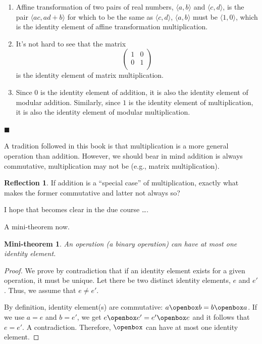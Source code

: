 \documentclass[english,notitlepage,smartquotes]{hgbreport}
\theoremstyle{definition}
\theoremstyle{definition}
\theoremstyle{remark}
\theoremstyle{definition}
\theoremstyle{plain}
\newtheorem{mini-theorem}{Mini-theorem}
\renewcommand\qedsymbol{$\blacksquare$}
\theoremstyle{definition}
\newtheorem{reflection}{Reflection}
\begin{document}
\begin{enumerate}
\item\label{item:affine} Affine transformation of two pairs of real numbers, $\langle a,b\rangle$ and $\langle c,d\rangle$, is the pair $\langle ac,ad+b\rangle$ for which to be the same as $\langle c,d\rangle$, $\langle a,b\rangle$ must be $\langle 1,0\rangle$, which is the identity element of affine transformation multiplication.
\item\label{item:matmultidelem} It's not hard to see that the matrix
\[
  \begin{pmatrix}
    1 & 0\\
    0 & 1\\
  \end{pmatrix}
\] 
is the identity element of matrix multiplication.
\item Since $0$ is the identity element of addition, it is also the identity element of modular addition. Similarly, since $1$ is the identity element of multiplication, it is also the identity element of modular multiplication. 
\end{enumerate}

\qedsymbol

A tradition followed in this book is that multiplication is a more general operation than addition. However, we should bear in mind addition is always commutative, multiplication may not be (e.g., matrix multiplication). 

\begin{reflection}
If addition is a ``special case'' of multiplication, exactly what makes the former commutative and latter not always so?

I hope that becomes clear in the due course \dots.
\end{reflection}

A mini-theorem now.
\begin{mini-theorem}
An operation (a binary operation) can have at most one identity element.
\end{mini-theorem}
\begin{proof}
We prove by contradiction that if an identity element exists for a given operation, it must be unique. Let there be two distinct identity elements, $e$ and $e'$. Thus, we assume that $e\ne e'$.

By definition, identity element(s) are commutative: $a\openbox b=b\openbox a$. If we use $a=e$ and $b=e'$, we get $e\openbox e'=e'\openbox e$ and it follows that $e=e'$. A contradiction. Therefore, $\openbox$ can have at most one identity element.
\end{proof}
\end{document}
